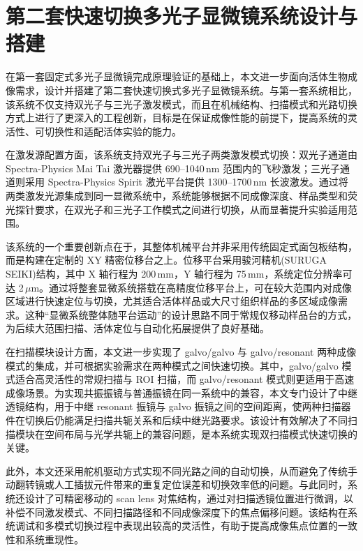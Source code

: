 \section{第二套快速切换多光子显微镜系统设计与搭建}\label{4.3}

在第一套固定式多光子显微镜完成原理验证的基础上，本文进一步面向活体生物成像需求，设计并搭建了第二套快速切换式多光子显微镜系统。与第一套系统相比，该系统不仅支持双光子与三光子激发模式，而且在机械结构、扫描模式和光路切换方式上进行了更深入的工程创新，目标是在保证成像性能的前提下，提高系统的灵活性、可切换性和适配活体实验的能力。

在激发源配置方面，该系统支持双光子与三光子两类激发模式切换：双光子通道由 Spectra-Physics Mai Tai 激光器提供 690--1040\,nm 范围内的飞秒激发；三光子通道则采用 Spectra-Physics Spirit 激光平台提供 1300--1700\,nm 长波激发。通过将两类激发光源集成到同一显微系统中，系统能够根据不同成像深度、样品类型和荧光探针要求，在双光子和三光子工作模式之间进行切换，从而显著提升实验适用范围。

该系统的一个重要创新点在于，其整体机械平台并非采用传统固定式面包板结构，而是构建在定制的 XY 精密位移台之上。位移平台采用骏河精机(SURUGA SEIKI)结构，其中 X 轴行程为 200\,mm，Y 轴行程为 75\,mm，系统定位分辨率可达 2\,$\mu$m。通过将整套显微系统搭载在高精度位移平台上，可在较大范围内对成像区域进行快速定位与切换，尤其适合活体样品或大尺寸组织样品的多区域成像需求。这种``显微系统整体随平台运动''的设计思路不同于常规仅移动样品台的方式，为后续大范围扫描、活体定位与自动化拓展提供了良好基础。

在扫描模块设计方面，本文进一步实现了 galvo/galvo 与 galvo/resonant 两种成像模式的集成，并可根据实验需求在两种模式之间快速切换。其中，galvo/galvo 模式适合高灵活性的常规扫描与 ROI 扫描，而 galvo/resonant 模式则更适用于高速成像场景。为实现共振振镜与普通振镜在同一系统中的兼容，本文专门设计了中继透镜结构，用于中继 resonant 振镜与 galvo 振镜之间的空间距离，使两种扫描器件在切换后仍能满足扫描共轭关系和后续中继光路要求。该设计有效解决了不同扫描模块在空间布局与光学共轭上的兼容问题，是本系统实现双扫描模式快速切换的关键。

此外，本文还采用舵机驱动方式实现不同光路之间的自动切换，从而避免了传统手动翻转镜或人工插拔元件带来的重复定位误差和切换效率低的问题。与此同时，系统还设计了可精密移动的 scan lens 对焦结构，通过对扫描透镜位置进行微调，以补偿不同激发模式、不同扫描路径和不同成像深度下的焦点偏移问题。该结构在系统调试和多模式切换过程中表现出较高的灵活性，有助于提高成像焦点位置的一致性和系统重现性。

